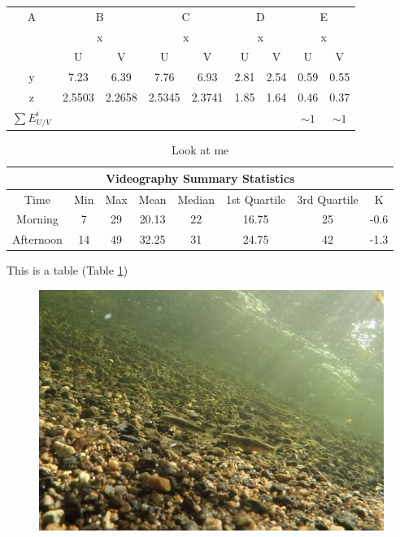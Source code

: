 \documentclass{article}\usepackage[]{graphicx}\usepackage[]{color}
\begin{document}
    \begin{tabular}{|*9{c|}}\hline
        A & \multicolumn{2}{c|}{B} & \multicolumn{2}{c|}{C} & \multicolumn{2}{c|}{D} & \multicolumn{2}{c|}{E} \\\cline{2-9}
        & \multicolumn{2}{c|}{x} & \multicolumn{2}{c|}{x} & \multicolumn{2}{c|}{x} & \multicolumn{2}{c|}{x} \\\cline{2-9}
        & U & V &  U & V & U & V & U & V \\\hline
        y  & 7.23 & 6.39  & 7.76 &  6.93 & 2.81 &  2.54 & 0.59 &  0.55  \\ \hline
        z  & 2.5503 &  2.2658  & 2.5345 &  2.3741 & 1.85 &  1.64 & 0.46 &  0.37   \\ \hline
        $\sum{E^{i}_{U/V}}$  & & & & &  & & $\sim 1$ & $\sim 1$   \\ [1ex]  \hline
    \end{tabular} 
    

\begin{table}
\begin{tabular}{|cccccccc|}
 \hline
 \multicolumn{8}{|c|}{Videography Summary Statistics} \\
 \hline
 Time & Min & Max & Mean & Median & 1st Quartile & 3rd Quartile & K\\
 \hline
 Morning & 7 & 29 & 20.13 & 22  & 16.75 & 25 & -0.6\\
 Afternoon & 14 & 49 & 32.25 & 31 & 24.75 &  42 & -1.3\\
 \hline
\end{tabular}
\caption{Look at me}
\label{tab:summarystat}
\end{table}
This is a table (Table \ref{tab:summarystat})


 
\begin{figure}
\includegraphics[scale=.5]{reallygoodcrop}

\end{figure}
\end{document}
